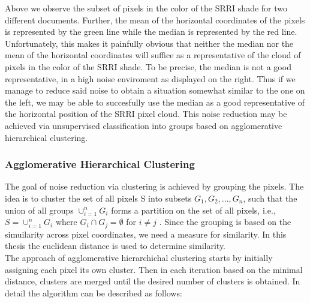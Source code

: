 \documentclass[aodsor,preprint]{imsart}
\numberwithin{equation}{section}
\theoremstyle{plain}
\begin{document}
Above we observe the subset of pixels in the color of the SRRI shade for two different documents. Further, the mean of the horizontal coordinates of the pixels is represented by the green line while the median is represented by the red line. Unfortunately, this makes it painfully obvious that neither the median nor the mean of the horizontal coordinates will suffice as a representative of the cloud of pixels in the color of the SRRI shade. To be precise, the median is not a good representative, in a high noise enviroment as displayed on the right. Thus if we manage to reduce said noise to obtain a situation somewhat similar to the one on the left, we may be able to succesfully use the median as a good representative of the horizontal position of the SRRI pixel cloud. This noise reduction may be achieved via unsupervised classification into groups based on agglomerative hierarchical clustering.
\newpage
\subsubsection{Agglomerative Hierarchical Clustering}
The goal of noise reduction via clustering is achieved by grouping the pixels. The idea is to cluster the set of all pixels S into subsets $G_1, G_2,..., G_n$, such that the union of all groups $\cup_{i = 1}^n G_i$ forms a partition on the set of all pixels, i.e., $S = \cup_{i = 1}^n G_i$ where $G_i \cap G_j = \emptyset$ for $i \neq j$ \citep{Rok09}. Since the grouping is based on the simuilarity across pixel coordinates, we need a measure for similarity. In this thesis the euclidean distance is used to determine similarity.\\
The approach of agglomerative hierarchichal clustering starts by initially assigning each pixel its own cluster. Then in each iteration based on the minimal distance, clusters are merged until the desired number of clusters is obtained. In detail the algorithm can be described as follows:

\end{document}
